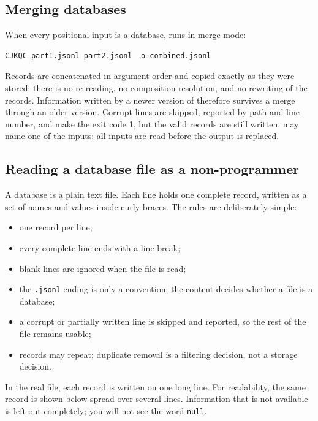 \subsection{Merging databases}\label{sec:merging}

When every positional input is a database, \CJKQC{} runs in merge mode:

\begin{verbatim}
CJKQC part1.jsonl part2.jsonl -o combined.jsonl
\end{verbatim}

Records are concatenated in argument order and copied exactly as they were
stored: there is no re-reading, no composition resolution, and no rewriting of
the records. Information written by a newer version of \CJKQC{} therefore
survives a merge through an older version. Corrupt lines are skipped, reported
by path and line number, and make the exit code 1, but the valid records are
still written.  may name one of the inputs; all inputs are read
before the output is replaced.

\subsection{Reading a database file as a non-programmer}\label{sec:jsonl}

A database is a plain text file. Each line holds one complete record, written
as a set of names and values inside curly braces. The rules are deliberately
simple:

\begin{itemize}
  \item one record per line;
  \item every complete line ends with a line break;
  \item blank lines are ignored when the file is read;
  \item the \texttt{.jsonl} ending is only a convention; the content decides
        whether a file is a database;
  \item a corrupt or partially written line is skipped and reported, so the
        rest of the file remains usable;
  \item records may repeat; duplicate removal is a filtering decision, not a
        storage decision.
\end{itemize}

In the real file, each record is written on one long line. For readability,
the same record is shown below spread over several lines. Information that is
not available is left out completely; you will not see the word
\texttt{null}.

